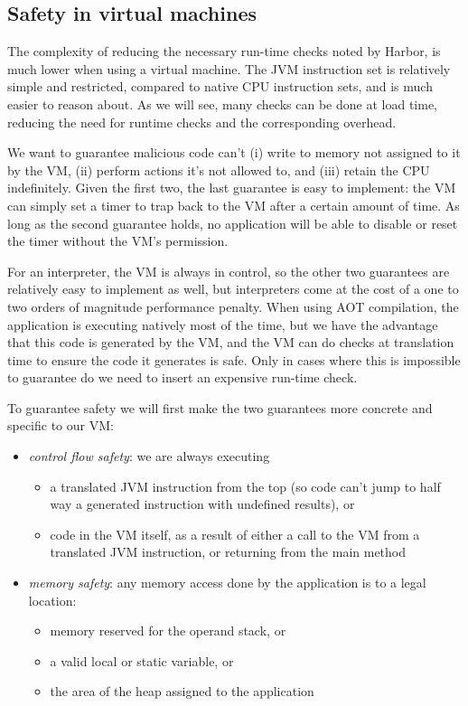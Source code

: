 \subsection{Safety in virtual machines}


The complexity of reducing the necessary run-time checks noted by Harbor, is much lower when using a virtual machine. The JVM instruction set is relatively simple and restricted, compared to native CPU instruction sets, and is much easier to reason about. As we will see, many checks can be done at load time, reducing the need for runtime checks and the corresponding overhead.

We want to guarantee malicious code can't (i) write to memory not assigned to it by the VM, (ii) perform actions it's not allowed to, and (iii) retain the CPU indefinitely. Given the first two, the last guarantee is easy to implement: the VM can simply set a timer to trap back to the VM after a certain amount of time. As long as the second guarantee holds, no application will be able to disable or reset the timer without the VM's permission.

For an interpreter, the VM is always in control, so the other two guarantees are relatively easy to implement as well, but interpreters come at the cost of a one to two orders of magnitude performance penalty. When using AOT compilation, the application is executing natively most of the time, but we have the advantage that this code is generated by the VM, and the VM can do checks at translation time to ensure the code it generates is safe. Only in cases where this is impossible to guarantee do we need to insert an expensive run-time check.

To guarantee safety we will first make the two guarantees more concrete and specific to our VM:

\begin{itemize}
	\item \emph{control flow safety}: we are always executing
		\begin{itemize}
			\item a translated JVM instruction from the top (so code can't jump to half way a generated instruction with undefined results), or
			\item code in the VM itself, as a result of either a call to the VM from a translated JVM instruction, or returning from the main method
		\end{itemize}
	\item \emph{memory safety}: any memory access done by the application is to a legal location:
		\begin{itemize}
			\item memory reserved for the operand stack, or
			\item a valid local or static variable, or
			\item the area of the heap assigned to the application
		\end{itemize}
\end{itemize}

